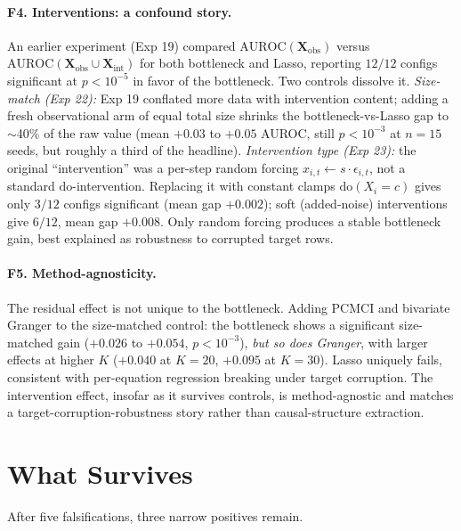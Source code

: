 \documentclass{article}
\begin{document}
\paragraph{F4. Interventions: a confound story.} An earlier experiment
(Exp 19) compared $\text{AUROC}(\mathbf{X}_{\text{obs}})$ versus
$\text{AUROC}(\mathbf{X}_{\text{obs}} \cup \mathbf{X}_{\text{int}})$ for
both bottleneck and Lasso, reporting $12/12$ configs significant at
$p < 10^{-5}$ in favor of the bottleneck. Two controls dissolve it.
\emph{Size-match (Exp 22):} Exp 19 conflated more data with intervention
content; adding a fresh observational arm of equal total size shrinks
the bottleneck-vs-Lasso gap to $\sim$40\% of the raw value (mean
$+0.03$ to $+0.05$ AUROC, still $p < 10^{-3}$ at $n{=}15$ seeds, but
roughly a third of the headline). \emph{Intervention type
(Exp 23):} the original ``intervention'' was a per-step random forcing
$x_{i,t} \leftarrow s\cdot \epsilon_{i,t}$, not a standard
$\text{do}$-intervention. Replacing it with constant clamps
$\text{do}(X_i = c)$ gives only $3/12$ configs significant (mean gap
$+0.002$); soft (added-noise) interventions give $6/12$, mean gap
$+0.008$. Only random forcing produces a stable bottleneck gain, best
explained as robustness to corrupted target rows.

\paragraph{F5. Method-agnosticity.} The residual effect is not unique to
the bottleneck. Adding PCMCI and bivariate Granger to the size-matched
control: the bottleneck shows a significant size-matched gain ($+0.026$
to $+0.054$, $p < 10^{-3}$), \emph{but so does Granger}, with larger
effects at higher $K$ ($+0.040$ at $K{=}20$, $+0.095$ at $K{=}30$).
Lasso uniquely fails, consistent with per-equation regression breaking
under target corruption. The intervention effect, insofar as it survives
controls, is method-agnostic and matches a target-corruption-robustness
story rather than causal-structure extraction.

\section{What Survives}
\label{sec:survives}

After five falsifications, three narrow positives remain.
\end{document}
